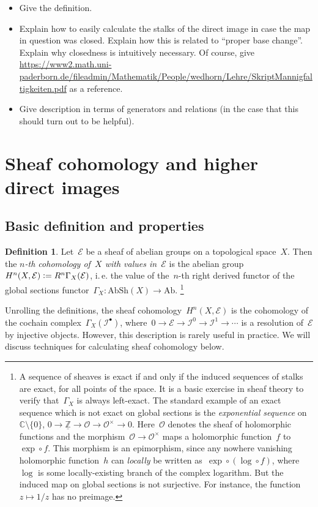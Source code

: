 \documentclass[10pt]{amsart}
\makeatletter
\theoremstyle{definition}
\newtheorem{defn}{Definition}[section]
\theoremstyle{plain}
\theoremstyle{remark}
\newcommand{\C}{\mathbb{C}}
\newcommand{\E}{\mathcal{E}}
\newcommand{\I}{\mathcal{I}}
\renewcommand{\O}{\mathcal{O}}
\newcommand{\Z}{\mathbb{Z}}
\newcommand{\Ab}{\mathrm{Ab}}
\newcommand{\AbSh}{\mathrm{AbSh}}
\newcommand{\defeq}{\vcentcolon=}
\newcommand{\ie}{i.\,e.\@\xspace}
\makeatother
\begin{document}
\begin{itemize}
\item Give the definition.
\item Explain how to easily calculate the stalks of the direct image in case
the map in question was closed. Explain how this is related to ``proper base
change''. Explain why closedness is intuitively necessary. Of course, give
\url{https://www2.math.uni-paderborn.de/fileadmin/Mathematik/People/wedhorn/Lehre/SkriptMannigfaltigkeiten.pdf}
as a reference.
\item Give description in terms of generators and relations (in the case that
this should turn out to be helpful).
\end{itemize}


\section{Sheaf cohomology and higher direct images}

\subsection{Basic definition and properties}

\begin{defn}Let~$\E$ be a sheaf of abelian groups on a topological space~$X$.
Then the \emph{$n$-th cohomology of~$X$ with values in~$\E$} is the abelian
group $H^n(X, \E) \defeq R^n\Gamma_X(\E)$, \ie the value of the~$n$-th right
derived functor of the global sections functor~$\Gamma_X : \AbSh(X) \to \Ab$.%
\footnote{A sequence of sheaves is exact if and only if the induced sequences of
stalks are exact, for all points of the space. It is a basic exercise in sheaf
theory to verify that~$\Gamma_X$ is always left-exact. The standard example of
an exact sequence which is not exact on global sections is the
\emph{exponential sequence} on~$\C \setminus \{0\}$, $0 \to \underline{\Z} \to \O \to
\O^\times \to 0$. Here~$\O$ denotes the sheaf of holomorphic functions and the
morphism~$\O \to \O^\times$ maps a holomorphic function~$f$ to~$\exp \circ f$.
This morphism is an epimorphism, since any nowhere vanishing holomorphic
function~$h$ can \emph{locally} be written as~$\exp \circ (\log \circ f)$,
where~$\log$ is some locally-existing branch of the complex logarithm. But the
induced map on global sections is not surjective. For instance, the function~$z
\mapsto 1/z$ has no preimage.}
\end{defn}

Unrolling the definitions, the sheaf cohomology~$H^n(X,\E)$ is the cohomology
of the cochain complex~$\Gamma_X(\I^\bullet)$, where~$0 \to \E \to \I^0 \to \I^1
\to \cdots$ is a resolution of~$\E$ by injective objects. However, this
description is rarely useful in practice. We will discuss techniques for
calculating sheaf cohomology below.
\end{document}
